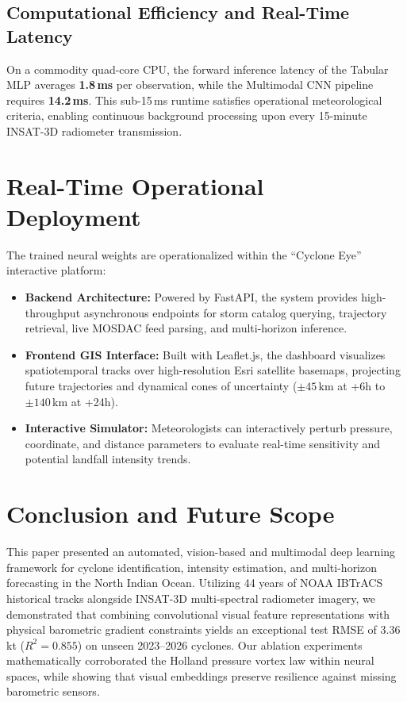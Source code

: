 \documentclass[conference]{IEEEtran}
\begin{document}
\subsection{Computational Efficiency and Real-Time Latency}
On a commodity quad-core CPU, the forward inference latency of the Tabular MLP averages \textbf{1.8\,ms} per observation, while the Multimodal CNN pipeline requires \textbf{14.2\,ms}. This sub-15\,ms runtime satisfies operational meteorological criteria, enabling continuous background processing upon every 15-minute INSAT-3D radiometer transmission.

\section{Real-Time Operational Deployment}
The trained neural weights are operationalized within the ``Cyclone Eye'' interactive platform:
\begin{itemize}
    \item \textbf{Backend Architecture:} Powered by FastAPI, the system provides high-throughput asynchronous endpoints for storm catalog querying, trajectory retrieval, live MOSDAC feed parsing, and multi-horizon inference.
    \item \textbf{Frontend GIS Interface:} Built with Leaflet.js, the dashboard visualizes spatiotemporal tracks over high-resolution Esri satellite basemaps, projecting future trajectories and dynamical cones of uncertainty ($\pm 45$\,km at +6h to $\pm 140$\,km at +24h).
    \item \textbf{Interactive Simulator:} Meteorologists can interactively perturb pressure, coordinate, and distance parameters to evaluate real-time sensitivity and potential landfall intensity trends.
\end{itemize}

\section{Conclusion and Future Scope}
This paper presented an automated, vision-based and multimodal deep learning framework for cyclone identification, intensity estimation, and multi-horizon forecasting in the North Indian Ocean. Utilizing 44 years of NOAA IBTrACS historical tracks alongside INSAT-3D multi-spectral radiometer imagery, we demonstrated that combining convolutional visual feature representations with physical barometric gradient constraints yields an exceptional test RMSE of 3.36\,kt ($R^2 = 0.855$) on unseen 2023--2026 cyclones. Our ablation experiments mathematically corroborated the Holland pressure vortex law within neural spaces, while showing that visual embeddings preserve resilience against missing barometric sensors.
\end{document}
